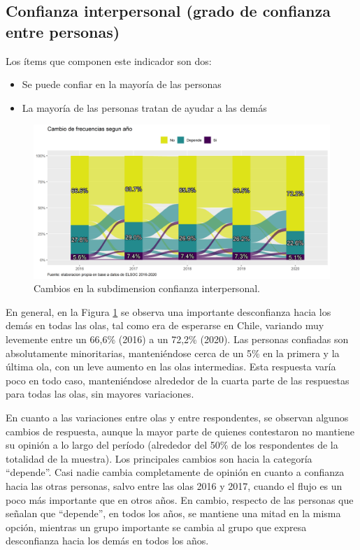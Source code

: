 \documentclass[
  12pt,
]{book}
\begin{document}
\hypertarget{confianza-interpersonal-grado-de-confianza-entre-personas}{%
\subsection{Confianza interpersonal (grado de confianza entre personas)}\label{confianza-interpersonal-grado-de-confianza-entre-personas}}

Los ítems que componen este indicador son dos:

\begin{itemize}
\item
  Se puede confiar en la mayoría de las personas
\item
  La mayoría de las personas tratan de ayudar a las demás
\end{itemize}

\begin{figure}[H]

{\centering \includegraphics[width=1\linewidth,height=1\textheight]{output/graphs/alluvial_conf_interpersonal} 

}

\caption{Cambios en la subdimension confianza interpersonal.}\label{fig:alluvial-conf-interpersonal}
\end{figure}

En general, en la Figura \ref{fig:alluvial-conf-interpersonal} se observa una importante desconfianza hacia los demás en todas las olas, tal como era de esperarse en Chile, variando muy levemente entre un 66,6\% (2016) a un 72,2\% (2020). Las personas confiadas son absolutamente minoritarias, manteniéndose cerca de un 5\% en la primera y la última ola, con un leve aumento en las olas intermedias. Esta respuesta varía poco en todo caso, manteniéndose alrededor de la cuarta parte de las respuestas para todas las olas, sin mayores variaciones.

En cuanto a las variaciones entre olas y entre respondentes, se observan algunos cambios de respuesta, aunque la mayor parte de quienes contestaron no mantiene su opinión a lo largo del período (alrededor del 50\% de los respondentes de la totalidad de la muestra). Los principales cambios son hacia la categoría ``depende''. Casi nadie cambia completamente de opinión en cuanto a confianza hacia las otras personas, salvo entre las olas 2016 y 2017, cuando el flujo es un poco más importante que en otros años. En cambio, respecto de las personas que señalan que ``depende'', en todos los años, se mantiene una mitad en la misma opción, mientras un grupo importante se cambia al grupo que expresa desconfianza hacia los demás en todos los años.
\end{document}
